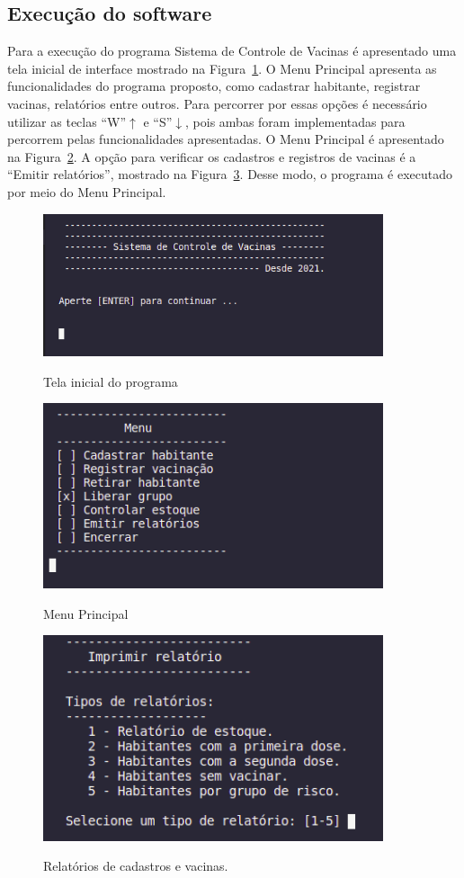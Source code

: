 \documentclass[12pt, a4paper]{article}
\begin{document}
\subsection{Execução do software}\label{Execução do software}
Para a execução do programa Sistema de Controle de Vacinas é apresentado uma tela inicial de interface mostrado na Figura~\ref{telainicial}. O Menu Principal apresenta as funcionalidades do programa proposto, como cadastrar habitante, registrar vacinas, relatórios entre outros. Para percorrer por essas opções é necessário utilizar as teclas ``W''$\uparrow$ e ``S''$\downarrow$, pois ambas foram implementadas para percorrem pelas funcionalidades apresentadas. O Menu Principal é apresentado na Figura~\ref{menu}. A opção para verificar os cadastros e registros de vacinas é a ``Emitir relatórios'', mostrado na Figura~\ref{relatorio}. Desse modo, o programa é executado por meio do Menu Principal.

\cleardoublepage
\begin{figure}[h]
	\caption{Tela inicial do programa}
	
	\centering %
	\includegraphics[width=10cm]{telaInicial.png} %
	\label{telainicial}
\end{figure}

\begin{figure}[h]
	\caption{Menu Principal}
	
	\centering %
	\includegraphics[width=10cm]{opcoes.png} %
	\label{menu}
\end{figure}

\begin{figure}[!h]
	\caption{Relatórios de cadastros e vacinas.}
	
	\centering %
	\includegraphics[width=10cm]{imprimirRelatorio.png} %
	\label{relatorio}
\end{figure}
\end{document}
